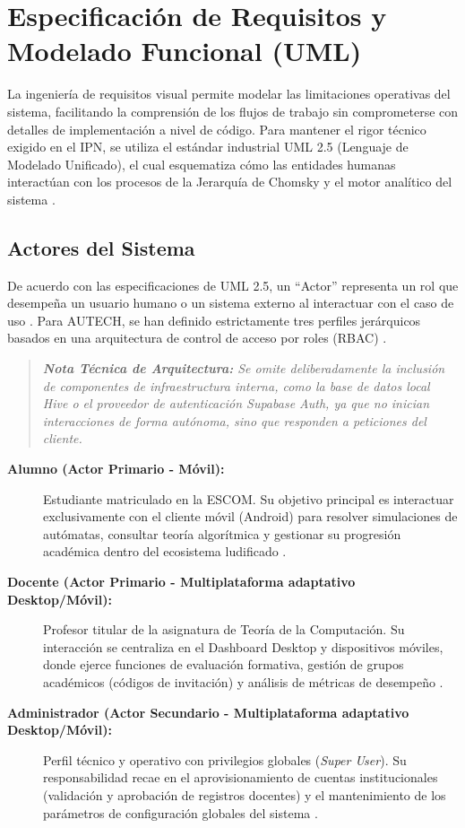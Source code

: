 \clearpage 

\section{Especificación de Requisitos y Modelado Funcional (UML)}
\label{sec:especificacion_uml}

La ingeniería de requisitos visual permite modelar las limitaciones operativas del sistema, facilitando la comprensión de los flujos de trabajo sin comprometerse con detalles de implementación a nivel de código. Para mantener el rigor técnico exigido en el IPN, se utiliza el estándar industrial UML 2.5 (Lenguaje de Modelado Unificado), el cual esquematiza cómo las entidades humanas interactúan con los procesos de la Jerarquía de Chomsky y el motor analítico del sistema \cite{pressman2020}.

\subsection{Actores del Sistema}
\label{subsec:actores_sistema}

De acuerdo con las especificaciones de UML 2.5, un ``Actor'' representa un rol que desempeña un usuario humano o un sistema externo al interactuar con el caso de uso \cite{pressman2020}. Para AUTECH, se han definido estrictamente tres perfiles jerárquicos basados en una arquitectura de control de acceso por roles (RBAC) \cite{supabase2024}.

\begin{quote}
    \small \textit{\textbf{Nota Técnica de Arquitectura:} Se omite deliberadamente la inclusión de componentes de infraestructura interna, como la base de datos local Hive o el proveedor de autenticación Supabase Auth, ya que no inician interacciones de forma autónoma, sino que responden a peticiones del cliente.}
\end{quote}

\begin{description}
    \item[\textbf{Alumno (Actor Primario - Móvil):}] Estudiante matriculado en la ESCOM. Su objetivo principal es interactuar exclusivamente con el cliente móvil (Android) para resolver simulaciones de autómatas, consultar teoría algorítmica y gestionar su progresión académica dentro del ecosistema ludificado \cite{ipn2020, materialdesign2023}.
    \item[\textbf{Docente (Actor Primario - Multiplataforma adaptativo Desktop/Móvil):}] Profesor titular de la asignatura de Teoría de la Computación. Su interacción se centraliza en el Dashboard Desktop y dispositivos móviles, donde ejerce funciones de evaluación formativa, gestión de grupos académicos (códigos de invitación) y análisis de métricas de desempeño \cite{felder2016}.
    \item[\textbf{Administrador (Actor Secundario - Multiplataforma adaptativo Desktop/Móvil):}] Perfil técnico y operativo con privilegios globales (\textit{Super User}). Su responsabilidad recae en el aprovisionamiento de cuentas institucionales (validación y aprobación de registros docentes) y el mantenimiento de los parámetros de configuración globales del sistema \cite{supabase2024}.
\end{description}
